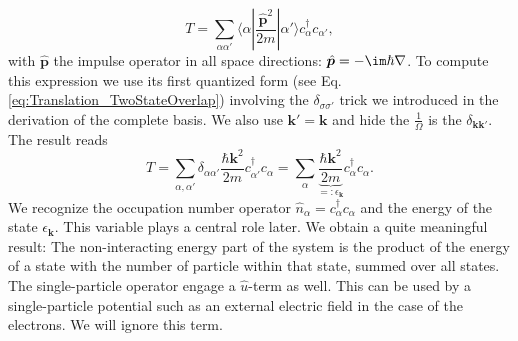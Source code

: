 \documentclass[../main.tex]{subfile}
\begin{document}
\[
    T = \sum_{\alpha\alpha'} \langle \alpha|\frac{\hat{\bm{p}}^2}{2m}|\alpha'\rangle c_{\alpha}^{\dagger}c_{\alpha'},
\]
with $\hat{\bm{p}}$ the impulse operator in all space directions: $\hat{\bm{p}} = -\im \hbar \nabla$. To compute this expression we use its 
first quantized form (see Eq. \ref{eq:Translation_TwoStateOverlap}) involving the $\delta_{\sigma\sigma'}$ trick we introduced
in the derivation of the complete basis. We also use  $\bm{k}' = \bm{k}$ and hide the $\frac{1}{\Omega}$ is the $\delta_{\bm{k}\bm{k}'}$. The result reads
\begin{equation}\label{eq:interactingGasT}
    T = \sum_{\alpha,\alpha'} \delta_{\alpha\alpha'} \frac{\hbar \bm{k}^2}{2m} c_{\alpha'}^{\dagger} c_{\alpha} 
    = \sum_{\alpha} \underbrace{\frac{\hbar \bm{k}^2}{2m}}_{=:\epsilon_{\bm{k}}} c_{\alpha}^{\dagger} c_{\alpha}.
\end{equation}
We recognize the occupation number operator $\hat{n}_{\alpha} = c_{\alpha}^{\dagger} c_{\alpha}$ and the energy of the state $\epsilon_{\bm{k}}$. This variable plays a central role later.
We obtain a quite meaningful result: The non-interacting energy part of the system is the product of the energy of a 
state with the number of particle within that state, summed over all states.
The single-particle operator engage a $\hat{u}$-term as well. This can be used by a single-particle potential such as an external electric field 
in the case of the electrons. We will ignore this term.\\
\end{document}
